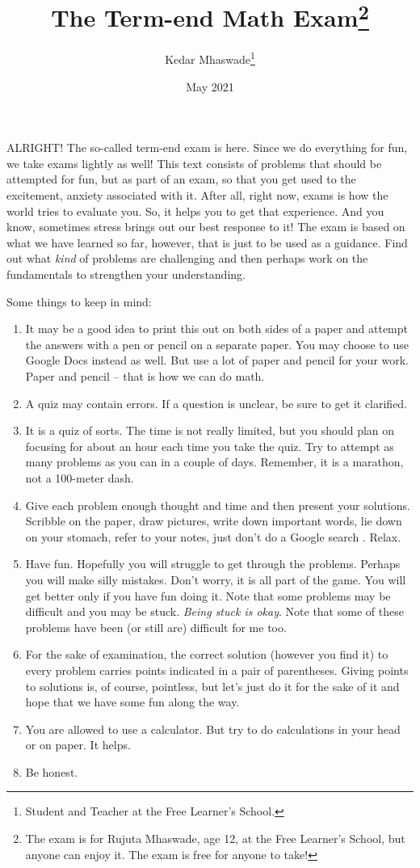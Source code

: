 \documentclass[12pt]{exam}         %
\title{The Term-end Math Exam\footnote{The exam is for Rujuta Mhaswade, age 12, at the Free Learner's School, but anyone can enjoy it. The exam is free for anyone to take!}}
\author{Kedar Mhaswade\footnote{Student and Teacher at the Free Learner's School.}}
\date{May 2021}
\begin{document}
\maketitle

\lettrine[lines=3]{A}{LRIGHT}! The so-called term-end exam is here. Since we do everything for fun, we take exams lightly as well!  This text consists of problems that should be attempted for fun, but as part of an exam, so that you get used to the excitement, anxiety associated with it. After all, right now, exams is how the world tries to evaluate you. So, it helps you to get that experience. And you know, sometimes stress brings out our best response to it! 
The exam is based on what we have learned so far, however, that is just to be used as a guidance. Find out what \emph{kind} of problems are challenging and then perhaps work on the fundamentals to strengthen your understanding.


Some things to keep in mind:
\begin{enumerate}
\item It may be a good idea to print this out on both sides of a paper and attempt the answers with a pen or pencil on a separate paper. You may choose to use Google Docs instead as well. But use a lot of paper and pencil for your work. Paper and pencil -- that is how we can do math.
\item A quiz may contain errors. If a question is unclear, be sure to get it clarified.
\item It is a quiz of sorts. The time is not really limited, but you should plan on focusing for about an hour each time you take the quiz. Try to attempt as many problems as you can in a couple of days. Remember, it is a marathon, not a 100-meter dash.
\item Give each problem enough thought and time and then present your solutions. Scribble on the paper, draw pictures, write down important words, lie down on your stomach, refer to your notes, just don't do a Google search \faSmileO. Relax.
\item Have fun. Hopefully you will struggle to get through the problems. Perhaps you will make silly mistakes. Don't worry, it is all part of the game. You will get better only if you have fun doing it. Note that some problems may be difficult and you may be stuck. \emph{Being stuck is okay}. Note that some of these problems have been (or still are) difficult for me too.
\item For the sake of examination, the correct solution (however you find it) to every problem carries points indicated in a pair of parentheses. Giving points to solutions is, of course, pointless, but let's just do it for the sake of it and hope that we have some fun along the way. 
\item You are allowed to use a calculator. But try to do calculations in your head or on paper. It helps.
\item Be honest.
\end{enumerate}
\end{document}
